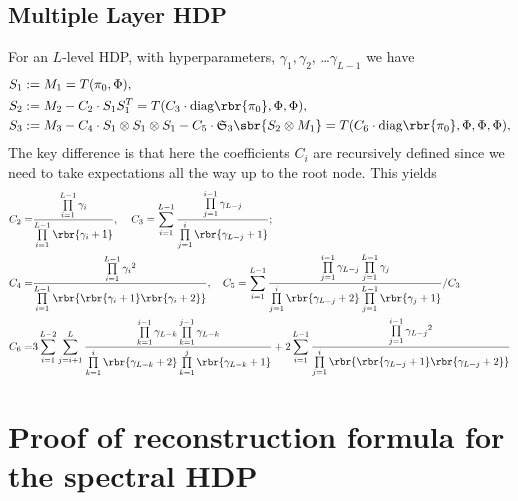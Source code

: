 \documentclass[twoside,11pt]{article}
\newcommand{\symm}{\mathfrak{S}}
\begin{document}
{\subsection{Multiple Layer HDP}

\begin{lemma}
\label{lem:hdpgmoments}
   For an $L$-level HDP, with hyperparameters, $\gamma_1, \gamma_2$,
   \ldots $\gamma_{L-1}$ we have
   \begin{align*}
    	 S_1 &:= M_1 = T(\pi_0, \Phi),\\
 	S_2 &:= M_2 - C_2 \cdot S_1 S_1^T = T( C_3 \cdot \mathrm{diag}\rbr{\pi_0}, \Phi,\Phi),\\
 	S_3 & :=  M_3 - C_4  \cdot S_1 \otimes S_1 \otimes S_1 -C_5  \cdot \symm_3\sbr{ S_2 \otimes M_1}= T(  C_6 \cdot  \mathrm{diag}\rbr{\pi_0}, \Phi,\Phi,\Phi) ,
   \end{align*}
   The key difference is that here the coefficients $C_i$ are
   recursively defined since we need to take expectations all the way
   up to the root node. This yields
 \begin{align*}
 C_2 =& \frac{\prod \limits_{i=1}^{L-1} \gamma_i }{ \prod
   \limits_{i=1}^{L-1} \rbr{\gamma_i +1} }, \,\,\,\,\,\,\,C_3 =   \sum \limits_{i=1}^{L-1} \frac{\prod \limits_{j=1}^{i-1} \gamma_{L-j} }{ \prod \limits_{j=1}^i \rbr{\gamma_{L-j} +1}  }; \nonumber \\
 C_4 =& \frac{\prod \limits_{i=1}^{L-1} {\gamma_i}^2  }{ \prod \limits_{i=1}^{L-1} \rbr{\rbr{\gamma_i +1}\rbr{\gamma_i +2}} }, \,\,\,\,\,\,C_5 = \sum \limits_{i=1}^{L-1}  \frac{\prod \limits_{j=1}^{i-1} {\gamma_{L-j}} \prod \limits_{j=1}^{L-1} \gamma_j }{ \prod \limits_{j=1}^i \rbr{\gamma_{L-j} +2}  \prod \limits_{j=1}^{L-1} \rbr{\gamma_j +1} }/C_3 \nonumber\\
 C_6 =& 3 \sum \limits_{i=1}^{L-2} \sum \limits_{j = i+1}^{L} \frac{ \prod \limits_{k=1}^{i-1}\gamma_{L-k} \prod \limits_{k=1}^{j-1} \gamma_{L-k} }{ \prod \limits_{k=1}^i \rbr{\gamma_{L-k} +2}  \prod \limits_{k=1}^j \rbr{\gamma_{L-k}+1} } + 2 \sum \limits_{i=1}^{L-1} \frac{\prod \limits_{j=1}^{i-1} {\gamma_{L-j}}^2  }{ \prod \limits_{j=1}^i \rbr{ \rbr{\gamma_{L-j} +1} \rbr{\gamma_{L-j} +2}}}\nonumber
 \end{align*}
 \end{lemma}

 
\section{Proof of reconstruction formula for the spectral HDP}

}
\end{document}
